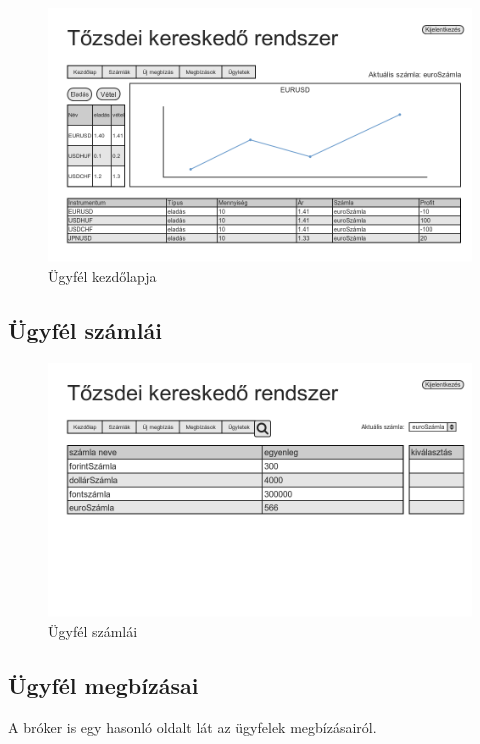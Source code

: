 \begin{figure}[!ht]
\centering
\includegraphics[width=150mm, keepaspectratio]{figures/user_1/Home.png}
\caption{Ügyfél kezdőlapja}
\label{fig:haromreteg}
\end{figure}

\subsection{Ügyfél számlái}

\begin{figure}[!ht]
\centering
\includegraphics[width=150mm, keepaspectratio]{figures/user_1/bills.png}
\caption{Ügyfél számlái}
\label{fig:haromreteg}
\end{figure}

\subsection{Ügyfél megbízásai}
A bróker is egy hasonló oldalt lát az ügyfelek megbízásairól.

